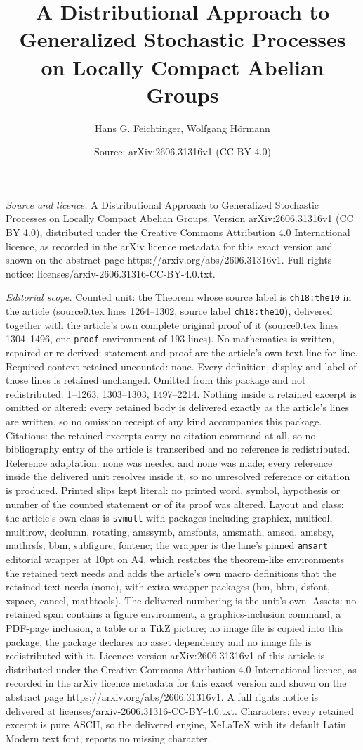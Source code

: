 \documentclass[10pt,a4paper]{amsart}
\title[A Distributional Approach to Generalized Stochastic Processe]{A Distributional Approach to Generalized Stochastic Processes on Locally Compact Abelian Groups}
\author{Hans G. Feichtinger, Wolfgang H\"ormann}
\date{Source: arXiv:2606.31316v1 (CC BY 4.0)}
\begin{document}
\maketitle

\noindent\emph{Source and licence.} A Distributional Approach to Generalized Stochastic Processes on Locally Compact Abelian Groups. Version arXiv:2606.31316v1 (CC BY 4.0), distributed under the Creative Commons Attribution 4.0 International licence, as recorded in the arXiv licence metadata for this exact version and shown on the abstract page https://arxiv.org/abs/2606.31316v1. Full rights notice: licenses/arxiv-2606.31316-CC-BY-4.0.txt.\par\smallskip

\noindent\textit{Editorial scope.} Counted unit: the Theorem whose source label is \texttt{ch18:the10} in the article (source0.tex lines 1264--1302, source label \texttt{ch18:the10}), delivered together with the article's own complete original proof of it (source0.tex lines 1304--1496, one \texttt{proof} environment of 193 lines). No mathematics is written, repaired or re-derived: statement and proof are the article's own text line for line. Required context retained uncounted: none. Every definition, display and label of those lines is retained unchanged. Omitted from this package and not redistributed: 1--1263, 1303--1303, 1497--2214. Nothing inside a retained excerpt is omitted or altered: every retained body is delivered exactly as the article's lines are written, so no omission receipt of any kind accompanies this package. Citations: the retained excerpts carry no citation command at all, so no bibliography entry of the article is transcribed and no reference is redistributed. Reference adaptation: none was needed and none was made; every reference inside the delivered unit resolves inside it, so no unresolved reference or citation is produced. Printed slips kept literal: no printed word, symbol, hypothesis or number of the counted statement or of its proof was altered. Layout and class: the article's own class is \texttt{svmult} with packages including graphicx, multicol, multirow, dcolumn, rotating, amssymb, amsfonts, amsmath, amscd, amsbsy, mathrsfs, bbm, subfigure, fontenc; the wrapper is the lane's pinned \texttt{amsart} editorial wrapper at 10pt on A4, which restates the theorem-like environments the retained text needs and adds the article's own macro definitions that the retained text needs (none), with extra wrapper packages (bm, bbm, dsfont, xspace, cancel, mathtools). The delivered numbering is the unit's own. Assets: no retained span contains a figure environment, a graphics-inclusion command, a PDF-page inclusion, a table or a TikZ picture; no image file is copied into this package, the package declares no asset dependency and no image file is redistributed with it. Licence: version arXiv:2606.31316v1 of this article is distributed under the Creative Commons Attribution 4.0 International licence, as recorded in the arXiv licence metadata for this exact version and shown on the abstract page https://arxiv.org/abs/2606.31316v1. A full rights notice is delivered at licenses/arxiv-2606.31316-CC-BY-4.0.txt. Characters: every retained excerpt is pure ASCII, so the delivered engine, XeLaTeX with its default Latin Modern text font, reports no missing character.
\end{document}
